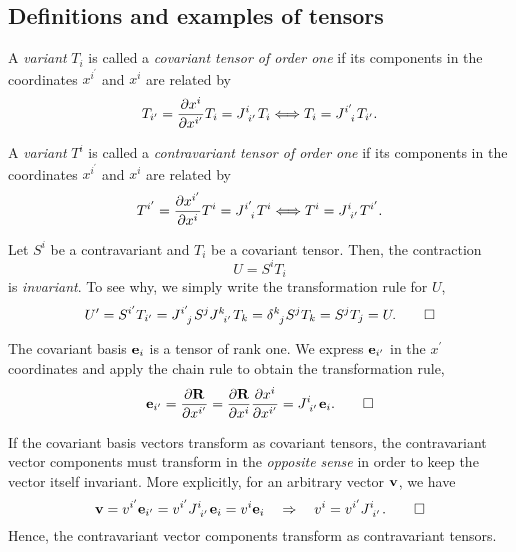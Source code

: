 \documentclass{article}
\begin{document}
	\subsection{Definitions and examples of tensors}
	\begin{definition}
		A \textit{variant} $ T_{i} $ is called a \textit{covariant tensor of order one} if its components in the coordinates $ x^{i^\prime} $ and $ x^{i} $ are related by
		\begin{equation}
			T_{i^\prime} = \pdv{x^{i}}{x^{i^\prime}} T_{i} = J\indices{^{i}_{i^\prime}} T_{i} \Longleftrightarrow T_{i} = J\indices{^{i^\prime}_{i}} T_{i^\prime}.
		\end{equation}
	\end{definition}
	\begin{definition}
		A \textit{variant} $ T^{i} $ is called a \textit{contravariant tensor of order one} if its components in the coordinates $ x^{i^\prime} $ and $ x^{i} $ are related by
		\begin{equation}
		T^{i^\prime} = \pdv{x^{i^\prime}}{x^{i}} T^{i} = J\indices{^{i^\prime}_{i}} T^{i} \Longleftrightarrow T^{i} = J\indices{^{i}_{i^\prime}} T^{i^\prime}.
		\end{equation}
	\end{definition}
	\begin{proposition}
		Let $ S^{i} $ be a contravariant and $ T_{i} $ be a covariant tensor. Then, the contraction
		\[
		U = S^{i}T_{i}
		\]
		is \textit{invariant}. To see why, we simply write the transformation rule for $ U $,
	\begin{equation}
	U^\prime = S^{i^\prime} T_{i^\prime} = J\indices{^{i^\prime}_{j}} S^{j} J\indices{^{k}_{i^\prime}} T_{k} = \delta\indices{^{k}_{j}} S^{j} T_{k} = S^{j} T_{j} = U. \qed
	\end{equation}
	\end{proposition}
	\begin{proposition}
		The covariant basis $ \vb{e}_{i} $ is a tensor of rank one. We express $ \vb{e}_{i^\prime} $ in the $ x^\prime $ coordinates and apply the chain rule to obtain the transformation rule,
		\begin{equation} \label{eq:26}
		\vb{e}_{i^\prime} = \pdv{\vb{R}}{x^{i^\prime}} = \pdv{\vb{R}}{x^{i}} \pdv{x^{i}}{x^{i^\prime}} = J\indices{^{i}_{i^\prime}} \vb{e}_{i}. \qed
		\end{equation}
	\end{proposition}
	\begin{proposition}
		If the covariant basis vectors transform as covariant tensors, the contravariant vector components must transform in the \textit{opposite sense} in order to keep the vector itself invariant. More explicitly, for an arbitrary vector $ \vb{v} $, we have
		\begin{equation}
		\vb{v} = v^{i^\prime} \vb{e}_{i^\prime} = v^{i^\prime} J\indices{^{i}_{i^\prime}} \vb{e}_{i} = v^{i} \vb{e}_{i} \implies v^{i} = v^{i^\prime} J\indices{^{i}_{i^\prime}}. \qed
		\end{equation}
		Hence, the contravariant vector components transform as contravariant tensors.
	\end{proposition}
\end{document}
